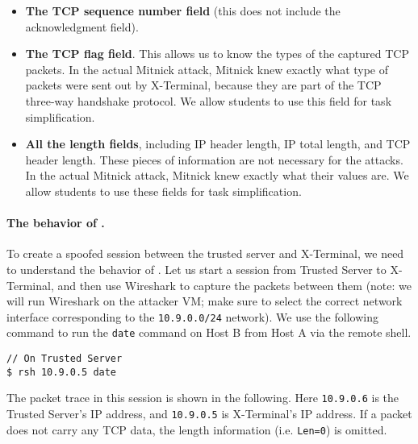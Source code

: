 \begin{itemize}
\item \textbf{The TCP sequence number field} (this does not include the acknowledgment
field).

\item \textbf{The TCP flag field}. This allows us to know the types of the 
captured TCP packets. In the actual Mitnick attack, Mitnick knew
exactly what type of packets were sent out by X-Terminal, because 
they are part of the TCP three-way handshake protocol. 
We allow students to use this field for task simplification. 


\item \textbf{All the length fields}, including IP header length, IP total length,
and TCP header length. These pieces of information are not necessary 
for the attacks. In the actual Mitnick attack, Mitnick knew exactly what their
values are. We allow students to use these fields for task simplification. 
\end{itemize}


\paragraph{The behavior of \rsh.} 
To create a spoofed \rsh session between the trusted server and X-Terminal,
we need to understand the behavior of \rsh. Let us start a 
\rsh session from Trusted Server to X-Terminal, and then use Wireshark
to capture the packets between them (note: we will run Wireshark
on the attacker VM; make sure to select the correct network
interface corresponding to the \texttt{10.9.0.0/24} network). 
We use the following command to
run the \texttt{date} command on Host B from Host A via the \rsh  
remote shell.


\begin{lstlisting}
// On Trusted Server
$ rsh 10.9.0.5 date
\end{lstlisting}
 
The packet trace in this \rsh session is shown in the following. 
Here \texttt{10.9.0.6} is the Trusted Server's IP address, 
and \texttt{10.9.0.5} is X-Terminal's IP address.
If a packet does not carry any TCP data, the length information (i.e.
\texttt{Len=0}) is omitted. 

